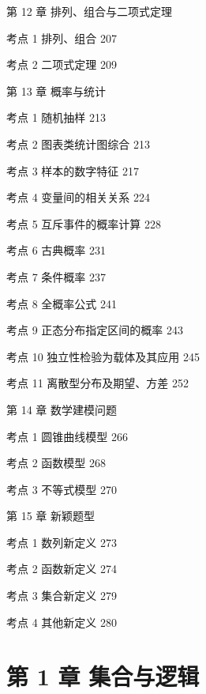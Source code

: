 第 12 章 排列、组合与二项式定理

考点 1 排列、组合 207

考点 2 二项式定理 209

第 13 章 概率与统计

考点 1 随机抽样 213

考点 2 图表类统计图综合 213

考点 3 样本的数字特征 217

考点 4 变量间的相关关系 224

考点 5 互斥事件的概率计算 228

考点 6 古典概率 231

考点 7 条件概率 237

考点 8 全概率公式 241

考点 9 正态分布指定区间的概率 243

考点 10 独立性检验为载体及其应用 245

考点 11 离散型分布及期望、方差 252

第 14 章 数学建模问题

考点 1 圆锥曲线模型 266

考点 2 函数模型 268

考点 3 不等式模型 270

第 15 章 新颖题型

考点 1 数列新定义 273

考点 2 函数新定义 274

考点 3 集合新定义 279

考点 4 其他新定义 280

\section*{第 1 章 集合与逻辑}

